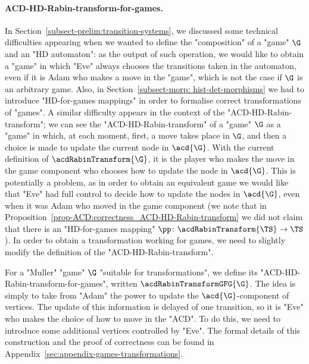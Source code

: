 \documentclass{theoretics}
\begin{document}
\paragraph*{ACD-HD-Rabin-transform-for-games.}

In Section~\ref{subsect-prelim:transition-systems}, we discussed some technical difficulties appearing when we wanted to define the "composition" of a "game" $\G$ and an "HD automaton": as the output of such operation, we would like to obtain a "game" in which "Eve" always chooses the transitions taken in the automaton, even if it is Adam who makes a move in the "game", which is not the case if $\G$ is an arbitrary game. Also, in Section~\ref{subsect-morp: hist-det-morphisms} we had to introduce "HD-for-games mappings" in order to formalise correct transformations of "games".
A similar difficulty appears in the context of the "ACD-HD-Rabin-transform"; we can see the "ACD-HD-Rabin-transform" of a "game" $\G$ as a "game" in which, at each moment, first, a move takes place in $\G$, and then a choice is made to update the current node in $\acd{\G}$. With the current definition of $\acdRabinTransform{\G}$, it is the player who makes the move in the game component who chooses how to update the node in $\acd{\G}$. This is potentially a problem, as in order to obtain an equivalent game we would like that "Eve" had full control to decide how to update the nodes in $\acd{\G}$, even when it was Adam who moved in the game component (we note that in Proposition~\ref{prop-ACD:correctness_ACD-HD-Rabin-transform} we did not claim that there is an "HD-for-games mapping" $\pp\colon \acdRabinTransform{\TS} \to \TS$).
In order to obtain a transformation working for games, we need to slightly modify the definition of the "ACD-HD-Rabin-transform". 

\AP  For a "Muller" "game" $\G$ "suitable for transformations", we define its "ACD-HD-Rabin-transform-for-games", written $\acdRabinTransformGFG{\G}$. The idea is simply to take from "Adam" the power to update the $\acd{\G}$-component of vertices. 
The update of this information is delayed of one transition, so it is "Eve" who makes the choice of how to move in the "ACD".
To do this, we need to introduce some additional vertices controlled by "Eve".
The formal details of this construction and the proof of correctness can be found in Appendix~\ref{sec:appendix-games-transformations}.
\end{document}
